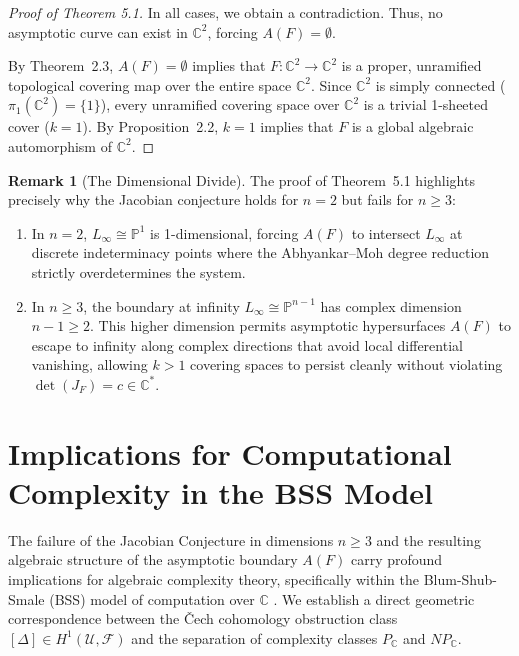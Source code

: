 \documentclass[11pt,reqno]{amsart}
\theoremstyle{definition}
\newtheorem{remark}[theorem]{Remark}
\begin{document}
\begin{proof}[Proof of Theorem 5.1]
In all cases, we obtain a contradiction. Thus, no asymptotic curve can exist in $\mathbb{C}^2$, forcing $A(F) = \emptyset$.

By Theorem~2.3, $A(F) = \emptyset$ implies that $F: \mathbb{C}^2 \to \mathbb{C}^2$ is a proper, unramified topological covering map over the entire space $\mathbb{C}^2$. Since $\mathbb{C}^2$ is simply connected ($\pi_1(\mathbb{C}^2) = \{1\}$), every unramified covering space over $\mathbb{C}^2$ is a trivial 1-sheeted cover ($k = 1$). By Proposition~2.2, $k = 1$ implies that $F$ is a global algebraic automorphism of $\mathbb{C}^2$.
\end{proof}

\begin{remark}[The Dimensional Divide]
The proof of Theorem~5.1 highlights precisely why the Jacobian conjecture holds for $n = 2$ but fails for $n \ge 3$:
\begin{enumerate}
    \item In $n = 2$, $L_\infty \cong \mathbb{P}^1$ is 1-dimensional, forcing $A(F)$ to intersect $L_\infty$ at discrete indeterminacy points where the Abhyankar--Moh degree reduction strictly overdetermines the system.
    \item In $n \ge 3$, the boundary at infinity $L_\infty \cong \mathbb{P}^{n-1}$ has complex dimension $n-1 \ge 2$. This higher dimension permits asymptotic hypersurfaces $A(F)$ to escape to infinity along complex directions that avoid local differential vanishing, allowing $k > 1$ covering spaces to persist cleanly without violating $\det(J_F) = c \in \mathbb{C}^*$.
\end{enumerate}
\end{remark}



\section{Implications for Computational Complexity in the BSS Model}

The failure of the Jacobian Conjecture in dimensions $n \ge 3$ and the resulting algebraic structure of the asymptotic boundary $A(F)$ carry profound implications for algebraic complexity theory, specifically within the Blum-Shub-Smale (BSS) model of computation over $\mathbb{C}$ \cite{BSS1989}. We establish a direct geometric correspondence between the \v{C}ech cohomology obstruction class $[\Delta] \in H^1(\mathcal{U}, \mathcal{F})$ and the separation of complexity classes $P_{\mathbb{C}}$ and $NP_{\mathbb{C}}$.
\end{document}
